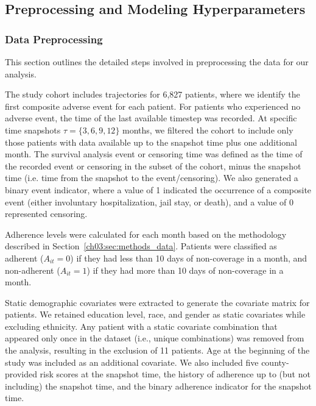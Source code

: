 \subsection{Preprocessing and Modeling Hyperparameters}\ChThreeHeadingOnly
\label{ch03:apd:preprocessing_and_modeling_hyperparameters}




\subsubsection{Data Preprocessing}
\label{ch03:apd:preprocessing}
This section outlines the detailed steps involved in preprocessing the data for our analysis.

The study cohort includes trajectories for 6,827 patients, where we identify the first composite adverse event for each patient.
For patients who experienced no adverse event, the time of the last available timestep was recorded.
At specific time snapshots \(\tau=\{3, 6, 9, 12\}\) months, we filtered the cohort to include only those patients with data available up to the snapshot time plus one additional month.
The survival analysis event or censoring time was defined as the time of the recorded event or censoring in the subset of the cohort, minus the snapshot time (i.e. time from the snapshot to the event/censoring).
We also generated a binary event indicator, where a value of 1 indicated the occurrence of a composite event (either involuntary hospitalization, jail stay, or death), and a value of 0 represented censoring.

Adherence levels were calculated for each month based on the methodology described in Section~\ref{ch03:sec:methods_data}.
Patients were classified as adherent ($A_{it}=0$) if they had less than 10 days of non-coverage in a month, and non-adherent ($A_{it}=1$) if they had more than 10 days of non-coverage in a month.

Static demographic covariates were extracted to generate the covariate matrix for patients.
We retained education level, race, and gender as static covariates while excluding ethnicity.
Any patient with a static covariate combination that appeared only once in the dataset (i.e., unique combinations) was removed from the analysis, resulting in the exclusion of 11 patients.
Age at the beginning of the study was included as an additional covariate.
We also included five county-provided risk scores at the snapshot time, the history of adherence up to (but not including) the snapshot time, and the binary adherence indicator for the snapshot time.

